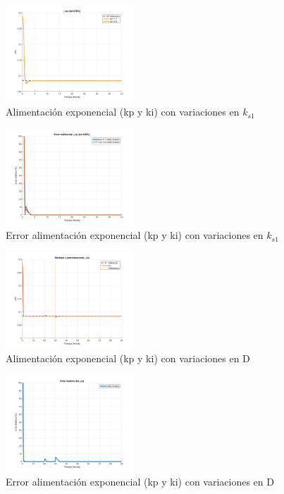 \documentclass[letterpaper, 10 pt, conference]{ieeeconf}  %
\begin{document}
\begin{figure}[H]
  \centering
  \includegraphics[width=0.43\textwidth]{./Images_tp3/exp_rob_ks1.png}
  \caption{Alimentación exponencial (kp y ki) con variaciones en $k_{s1}$ }
\end{figure}
\begin{figure}[H]
  \centering
  \includegraphics[width=0.43\textwidth]{./Images_tp3/exp_rob_err_ks1.png}
  \caption{Error alimentación exponencial (kp y ki) con variaciones en $k_{s1}$ }
\end{figure}

\begin{figure}[H]
  \centering
  \includegraphics[width=0.43\textwidth]{./Images_tp3/exp_rech.png}
  \caption{Alimentación exponencial (kp y ki) con variaciones en D }
\end{figure}
\begin{figure}[H]
  \centering
  \includegraphics[width=0.43\textwidth]{./Images_tp3/exp_rech_err.png}
  \caption{Error alimentación exponencial (kp y ki) con variaciones en D }
\end{figure}
\end{document}
